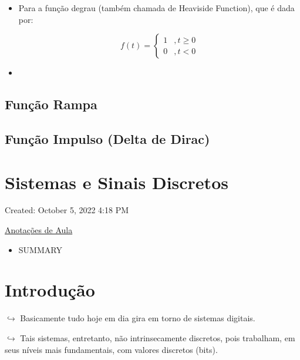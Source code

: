 \documentclass{article}
\begin{document}
\begin{itemize}
\begin{itemize}
\item
  Para a função degrau (também chamada de Heaviside Function), que é
  dada por:

  \[
    f(t) = \begin{cases}
    1 & , t \ge 0 \\ 
    0 & , t < 0
    \end{cases}
    \]
\item
\end{itemize}

\hypertarget{funuxe7uxe3o-rampa}{%
\subsection{Função Rampa}\label{funuxe7uxe3o-rampa}}

\hypertarget{funuxe7uxe3o-impulso-delta-de-dirac}{%
\subsection{Função Impulso (Delta de
Dirac)}\label{funuxe7uxe3o-impulso-delta-de-dirac}}

\hypertarget{sistemas-e-sinais-discretos}{%
\section{Sistemas e Sinais
Discretos}\label{sistemas-e-sinais-discretos}}

Created: October 5, 2022 4:18 PM

\href{Sistemas\%20e\%20Sinais\%20Discretos\%20c31f42a2f7bb4ad2ab76f18a4d431de6/Anotac\%CC\%A7o\%CC\%83es\%20de\%20Aula\%20e5585af81899476781609c4216a9b8b4.md}{Anotações
de Aula}

\begin{itemize}
\tightlist
\item
  SUMMARY
\end{itemize}

\hypertarget{introduuxe7uxe3o-4}{%
\section{Introdução}\label{introduuxe7uxe3o-4}}

\(\hookrightarrow\) Basicamente tudo hoje em dia gira em torno de
sistemas digitais.

\(\hookrightarrow\) Tais sistemas, entretanto, não intrinsecamente
discretos, pois trabalham, em seus níveis mais fundamentais, com valores
discretos (bits).


\end{itemize}
\end{document}
